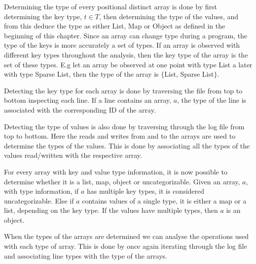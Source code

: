 Determining the type of every positional distinct array is done by first determining the key type, $t\in T$, then determining the type of the values, and from this deduce the type as either List, Map or Object as defined in the beginning of this chapter. Since an array can change type during a program, the type of the keys is more accurately a set of types. If an array is observed with different key types throughout the analysis, then the key type of the array is the set of these types. E.g let an array be observed at one point with type List a later with type Sparse List, then the type of the array is $\{$List, Sparse List$\}$.

Detecting the key type for each array is done by traversing the file from top to bottom inspecting each line. If a line contains an array, $a$, the type of the line is associated with the corresponding ID of the array.

Detecting the type of values is also done by traversing through the log file from top to bottom. Here the reads and writes from and to the arrays are used to determine the types of the values. This is done by associating all the types of the values read/written with the respective array. 

For every array with key and value type information, it is now possible to determine whether it is a list, map, object or uncategorizable. Given an array, $a$, with type information, if $a$ has multiple key types, it is considered uncategorizable. Else if $a$ contains values of a single type, it is either a map or a list, depending on the key type. If the values have multiple types, then $a$ is an object.

When the types of the arrays are determined we can analyse the operations used with each type of array. This is done by once again iterating through the log file and associating line types with the type of the arrays.